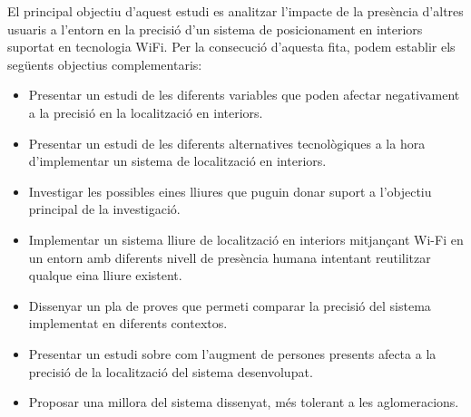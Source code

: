 
El principal objectiu d'aquest estudi es analitzar l'impacte de la presència d'altres usuaris a l'entorn en la precisió d'un sistema de posicionament en interiors suportat en tecnologia WiFi. Per la consecució d'aquesta fita, podem establir els següents objectius complementaris:

\begin{itemize}
    \item Presentar un estudi de les diferents variables que poden afectar negativament a la precisió en la localització en interiors.
    \item Presentar un estudi de les diferents alternatives tecnològiques a la hora d'implementar un sistema de localització en interiors.
    \item Investigar les possibles eines lliures que puguin donar suport a l'objectiu principal de la investigació.
    \item Implementar un sistema lliure de localització en interiors mitjançant Wi-Fi en un entorn amb diferents nivell de presència humana intentant reutilitzar qualque eina lliure existent.
    \item Dissenyar un pla de proves que permeti comparar la precisió del sistema implementat en diferents contextos.
    \item Presentar un estudi sobre com l’augment de persones presents afecta a la precisió de la localització del sistema desenvolupat.
    \item Proposar una millora del sistema dissenyat, més tolerant a les aglomeracions.
\end{itemize}
